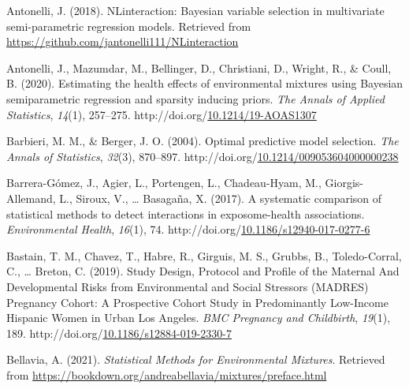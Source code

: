 \documentclass[12pt, twoside]{amherstthesis}
\newenvironment{CSLReferences}[2]%
  {}%
  {\par}
\begin{document}
\hypertarget{refs}{}
\begin{CSLReferences}{1}{0}
\leavevmode{}%
Antonelli, J. (2018). {NLinteraction}: {Bayesian} variable selection in multivariate semi-parametric regression models. Retrieved from \url{https://github.com/jantonelli111/NLinteraction}

\leavevmode{}%
Antonelli, J., Mazumdar, M., Bellinger, D., Christiani, D., Wright, R., \& Coull, B. (2020). Estimating the health effects of environmental mixtures using {Bayesian} semiparametric regression and sparsity inducing priors. \emph{The Annals of Applied Statistics}, \emph{14}(1), 257--275. http://doi.org/\href{https://doi.org/10.1214/19-AOAS1307}{10.1214/19-AOAS1307}

\leavevmode{}%
Barbieri, M. M., \& Berger, J. O. (2004). Optimal predictive model selection. \emph{The Annals of Statistics}, \emph{32}(3), 870--897. http://doi.org/\href{https://doi.org/10.1214/009053604000000238}{10.1214/009053604000000238}

\leavevmode{}%
Barrera-Gómez, J., Agier, L., Portengen, L., Chadeau-Hyam, M., Giorgis-Allemand, L., Siroux, V., \ldots{} Basagaña, X. (2017). A systematic comparison of statistical methods to detect interactions in exposome-health associations. \emph{Environmental Health}, \emph{16}(1), 74. http://doi.org/\href{https://doi.org/10.1186/s12940-017-0277-6}{10.1186/s12940-017-0277-6}

\leavevmode{}%
Bastain, T. M., Chavez, T., Habre, R., Girguis, M. S., Grubbs, B., Toledo-Corral, C., \ldots{} Breton, C. (2019). Study {Design}, {Protocol} and {Profile} of the {Maternal} {And} {Developmental} {Risks} from {Environmental} and {Social} {Stressors} ({MADRES}) {Pregnancy} {Cohort}: A {Prospective} {Cohort} {Study} in {Predominantly} {Low}-{Income} {Hispanic} {Women} in {Urban} {Los} {Angeles}. \emph{BMC Pregnancy and Childbirth}, \emph{19}(1), 189. http://doi.org/\href{https://doi.org/10.1186/s12884-019-2330-7}{10.1186/s12884-019-2330-7}

\leavevmode{}%
Bellavia, A. (2021). \emph{Statistical {Methods} for {Environmental} {Mixtures}}. Retrieved from \url{https://bookdown.org/andreabellavia/mixtures/preface.html}


\end{CSLReferences}
\end{document}
